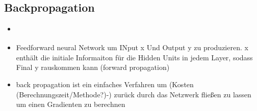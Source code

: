 \begin{itemize}
\end{itemize}
\subsection{Backpropagation}
\begin{itemize}
    \item \cite{Goodfellow-et-al-2016}
    \item Feedforward neural Network um INput x Und Output y zu produzieren. x enthält die initiale Informaiton für die Hidden Units in jedem Layer, sodass Final y rauskommen kann (forward propagation)
    \item back propagation ist ein einfaches Verfahren um (Kosten (Berechnungszeit/Methode?)-) zurück durch das Netzwerk fließen zu lassen um einen Gradienten zu berechnen
\end{itemize}
